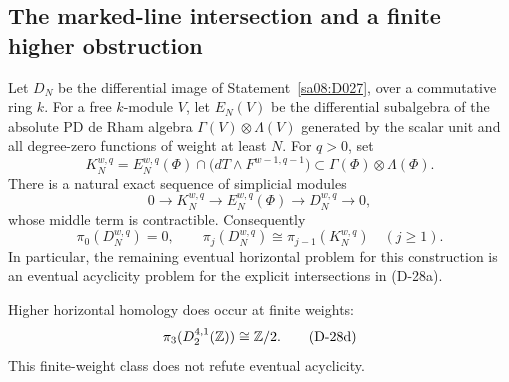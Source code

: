 \subsection{The marked-line intersection and a finite higher obstruction}

\begin{proposition}
\label{sa08:D028}
Let \(D_N\) be the differential image of
Statement~\ref{sa08:D027}, over a commutative ring \(k\).
For a free \(k\)-module \(V\), let \(E_N(V)\) be the differential
subalgebra of the absolute PD de Rham algebra
\(\Gamma(V)\otimes\Lambda(V)\) generated by the scalar unit and
all degree-zero functions of weight at least \(N\).
For \(q>0\), set
\[
 K_N^{w,q}=E_N^{w,q}(\Phi)\cap
       \bigl(dT\wedge F^{w-1,q-1}\bigr)
       \subset\Gamma(\Phi)\otimes\Lambda(\Phi).
 \tag{D-28a}
\]
There is a natural exact sequence of simplicial modules
\[
 0\longrightarrow K_N^{w,q}\longrightarrow E_N^{w,q}(\Phi)
   \longrightarrow D_N^{w,q}\longrightarrow0,
 \tag{D-28b}
\]
whose middle term is contractible. Consequently
\[
 \pi_0(D_N^{w,q})=0,\qquad
 \pi_j(D_N^{w,q})\cong\pi_{j-1}(K_N^{w,q})\quad(j\ge1).
 \tag{D-28c}
\]
In particular, the remaining eventual horizontal problem
for this construction is an eventual acyclicity problem
for the explicit intersections in (D-28a).

Higher horizontal homology does occur at finite weights:
\[
                 \pi_3(D_2^{4,1}(\mathbb Z))\cong\mathbb Z/2.
 \tag{D-28d}
\]
This finite-weight class does not refute eventual acyclicity.
\end{proposition}

